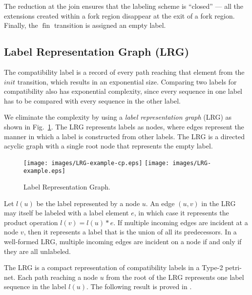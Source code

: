 \documentclass[conference]{IEEEtran}
\newcommand{\sym}[1]{$\operatorname{#1}$}
\begin{document}
The reduction at the join ensures that the labeling scheme is
``closed'' --- all the extensions created within a fork region
disappear at the exit of a fork region\cite{ahir_thesis}. Finally, the
\sym{fin} transition is assigned an empty label.

\subsection{Label Representation Graph (LRG)}

The compatibility label is a record of every path reaching that
element from the $init$ transition, which results in an exponential
size. Comparing two labels for compatibility also has exponential
complexity, since every sequence in one label has to be compared with
every sequence in the other label.

We eliminate the complexity by using a {\em label representation
  graph} (LRG) as shown in Fig.~\ref{figure:LRG}. The LRG represents
labels as nodes, where edges represent the manner in which a label is
constructed from other labels. The LRG is a directed acyclic graph
with a single root node that represents the empty label.

\begin{figure}[!t]
  \centering
  \texttt{[image: images/LRG-example-cp.eps]}
  \hspace{0.125in}
  \texttt{[image: images/LRG-example.eps]}
  \caption{Label Representation Graph.}
  \label{figure:LRG}
\end{figure}

Let $l(u)$ be the label represented by a node $u$. An edge $(u,v)$ in
the LRG may itself be labeled with a label element $e$, in which case
it represents the product operation $l(v) = l(u) * e$. If multiple
incoming edges are incident at a node $v$, then it represents a label
that is the union of all its predecessors. In a well-formed LRG,
multiple incoming edges are incident on a node if and only if they are
all unlabeled.

The LRG is a compact representation of compatibility labels in a
Type-2 petri-net. Each path reaching a node $u$ from the root of the
LRG represents one label sequence in the label $l(u)$. The following
result is proved in \cite{ahir_thesis}.
\end{document}
